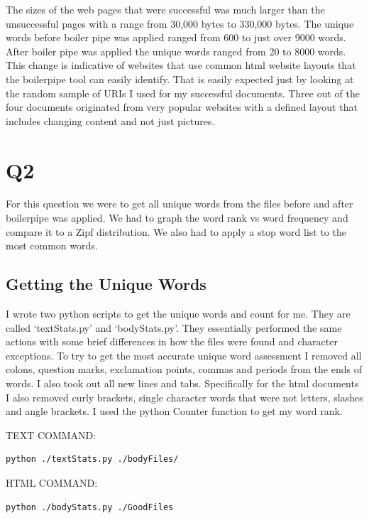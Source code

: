 \documentclass[12pt]{article}
\begin{document}
The sizes of the web pages that were successful was much larger than the unsuccessful pages with a range from 30,000 bytes to 330,000 bytes.  The unique words before boiler pipe was applied ranged from 600 to just over 9000 words. After boiler pipe was applied the unique words ranged from 20 to 8000 words. This change is indicative of websites that use common html website layouts that the boilerpipe tool can easily identify. That is easily expected just by looking at the random sample of URIs I used for my successful documents. Three out of the four documents originated from very popular websites with a defined layout that includes changing content and not just pictures.

\section{Q2}
For this question we were to get all unique words from the files before and after boilerpipe was applied. We had to graph the word rank vs word frequency and compare it to a Zipf distribution. We also had to apply a stop word list to the most common words.

\subsection{Getting the Unique Words}
I wrote two python scripts to get the unique words and count for me.  They are called `textStats.py' and `bodyStats.py'.  They essentially performed the same actions with some brief differences in how the files were found and character exceptions.  To try to get the most accurate unique word assessment I removed all colons, question marks, exclamation points, commas and periods from the ends of words.  I also took out all new lines and tabs.  Specifically for the html documents I also removed curly brackets, single character words that were not letters, slashes and angle brackets.  I used the python Counter function to get my word rank.

TEXT COMMAND:\\
\begin{lstlisting}[language=bash]
    python ./textStats.py ./bodyFiles/
\end{lstlisting}

HTML COMMAND:\\
\begin{lstlisting}[language=bash]
    python ./bodyStats.py ./GoodFiles
\end{lstlisting}
\end{document}
